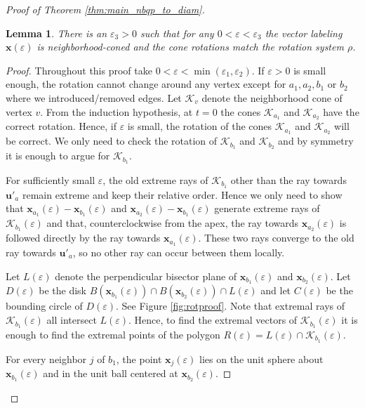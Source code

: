 \documentclass{article}
\newtheorem{lemma}[theorem]{Lemma}
\newcommand{\vu}[0]{\mathbf{u}}
\newcommand{\vx}[0]{\mathbf{x}}
\newcommand{\Kc}[0]{\mathcal{K}}
\begin{document}
\begin{proof}[Proof of Theorem \ref{thm:main_nbqp_to_diam}]
 
     

    \begin{lemma}\label{lem:checkingrotation}
        There is an $\varepsilon_3>0$ such that for any $0<\varepsilon<\varepsilon_3$ the vector labeling $\vx(\varepsilon)$ is neighborhood-coned and the cone rotations match the rotation system $\rho$. 
    \end{lemma}
    \begin{proof}

    
Throughout this proof take $0<\varepsilon<\min(\varepsilon_1,\varepsilon_2)$. 
If $\varepsilon>0$ is small enough, the rotation cannot change around any vertex except for $a_1,a_2,b_1$ or $b_2$ where we introduced/removed edges.
 Let $\Kc_v$ denote the neighborhood cone of vertex $v$. From the induction hypothesis, at $t=0$ the cones $\Kc_{a_1}$ and $\Kc_{a_2}$ have the correct rotation. Hence, if $\varepsilon$ is small, the rotation of the cones $\Kc_{a_1}$ and $\Kc_{a_2}$ will be correct. We only need to check the rotation of $\Kc_{b_1}$ and $\Kc_{b_2}$ and by symmetry it is enough to argue for $\Kc_{b_1}$. 

For sufficiently small $\varepsilon$, the old extreme rays of $\Kc_{b_1}$ other than the ray towards $\vu'_a$ remain extreme and keep their relative order. Hence we only need to show that $\vx_{a_1}(\varepsilon)-\vx_{b_1}(\varepsilon)$ and $\vx_{a_2}(\varepsilon)-\vx_{b_1}(\varepsilon)$ generate extreme rays of $\Kc_{b_1}(\varepsilon)$ and that, counterclockwise from the apex, the ray towards $\vx_{a_2}(\varepsilon)$ is followed directly by the ray towards $\vx_{a_1}(\varepsilon)$. These two rays converge to the old ray towards $\vu'_a$, so no other ray can occur between them locally.

 Let $L(\varepsilon)$ denote the perpendicular bisector plane of $\vx_{b_1}(\varepsilon)$ and $\vx_{b_2}(\varepsilon)$. Let $D(\varepsilon)$ be the disk $B(\vx_{b_1}(\varepsilon))\cap B(\vx_{b_2}(\varepsilon))\cap L(\varepsilon)$ and let $C(\varepsilon)$ be the bounding circle of $D(\varepsilon)$. See Figure \ref{fig:rotproof}. Note that extremal rays of $\Kc_{b_1}(\varepsilon)$ all intersect $L(\varepsilon)$. Hence, to find the extremal vectors of $\Kc_{b_1}(\varepsilon)$ it is enough to find the extremal points of the polygon $R(\varepsilon)=L(\varepsilon)\cap \Kc_{b_1}(\varepsilon)$. 

For every neighbor $j$ of $b_1$, the point $\vx_j(\varepsilon)$ lies on the unit sphere about $\vx_{b_1}(\varepsilon)$ and in the unit ball centered at $\vx_{b_2}(\varepsilon)$. 
    

\end{proof}
\end{proof}
\end{document}
